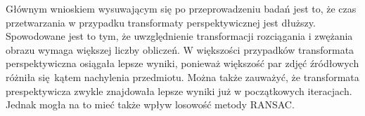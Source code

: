 \documentclass[../main.tex]{subfiles}
\begin{document}
    \justify
    Głównym wnioskiem wysuwającym się po przeprowadzeniu badań jest to, że czas przetwarzania w przypadku transformaty perspektywicznej jest dłuższy. Spowodowane jest to tym, że uwzględnienie transformacji rozciągania i zwężania obrazu wymaga większej liczby obliczeń. W większości przypadków transformata perspektywiczna osiągała lepsze wyniki, ponieważ większość par zdjęć źródłowych różniła się kątem nachylenia przedmiotu. Można także zauważyć, że transformata prespektywicza zwykle znajdowała lepsze wyniki już w początkowych iteracjach. Jednak mogła na to mieć także wpływ losowość metody RANSAC.
    
\end{document}
